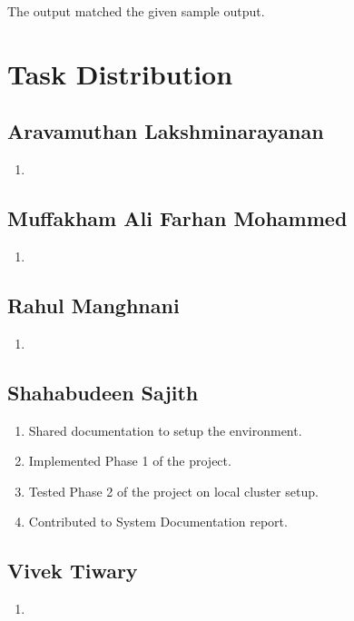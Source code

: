 The output matched the given sample output.

\newpage

\section{Task Distribution}

\subsection{Aravamuthan Lakshminarayanan}
\begin{enumerate}
    \item 
\end{enumerate}

\subsection{Muffakham Ali Farhan Mohammed}
\begin{enumerate}
    \item 
\end{enumerate}

\subsection{Rahul Manghnani}
\begin{enumerate}
    \item 
\end{enumerate}

\subsection{Shahabudeen Sajith}
\begin{enumerate}
    \item Shared documentation to setup the environment.
    \item Implemented Phase 1 of the project.
    \item Tested Phase 2 of the project on local cluster setup.
    \item Contributed to System Documentation report.
\end{enumerate}

\subsection{Vivek Tiwary}
\begin{enumerate}
    \item 
\end{enumerate}



\newpage



